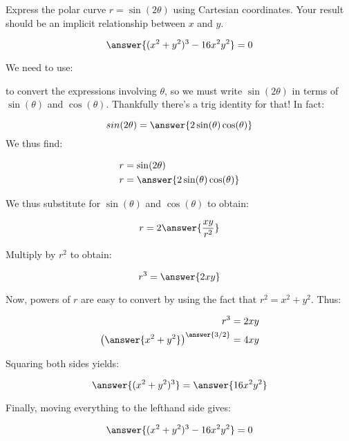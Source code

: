 \documentclass{ximera}
\author{Jim Talamo }
\begin{document}
\begin{exercise}

Express the polar curve $r= \sin(2\theta)$ using Cartesian coordinates.  Your result should be an implicit relationship between $x$ and $y$.

\[
\answer{(x^2+y^2)^3-16x^2y^2} = 0
\]

\begin{hint}
We need to use:

\begin{multipleChoice}
\end{multipleChoice}

to convert the expressions involving $\theta$, so we must write $\sin(2\theta)$ in terms of $\sin(\theta)$ and $\cos(\theta)$.  Thankfully there's a trig identity for that!  In fact:

\[
sin(2\theta) = \answer{2 \sin(\theta)\cos(\theta)}
\]
We thus find:

\begin{align*}
r &= \sin(2\theta) \\
r & = \answer{2 \sin(\theta)\cos(\theta)}
\end{align*}

\begin{question}
We thus substitute for $\sin(\theta)$ and $\cos(\theta)$ to obtain:

\[
r =2\answer{\frac{xy}{r^2}}
\]

Multiply by $r^2$ to obtain:

\[
r^3 = \answer{2xy}
\]

\begin{question}
Now, powers of $r$ are easy to convert by using the fact that $r^2 = x^2+y^2$.  Thus:

\begin{align*}
r^3 &= 2xy\\
\left(\answer{x^2+y^2}\right)^{\answer{3/2}} &= 4xy
\end{align*}

Squaring both sides yields:

\[
\answer{(x^2+y^2)^3} = \answer{16x^2y^2}
\]

Finally, moving everything to the lefthand side gives:

\[
\answer{(x^2+y^2)^3-16x^2y^2} = 0
\]
\end{question}
\end{question}

\end{hint}

\end{exercise}
\end{document}
